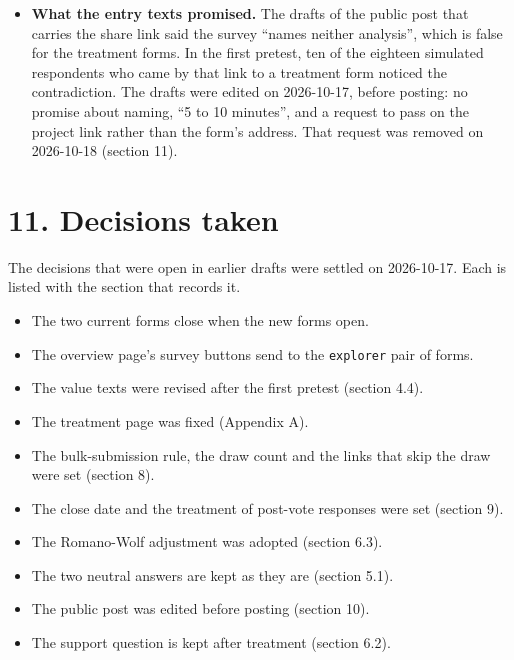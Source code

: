 \begin{itemize}
  seen each value's study on the explorer's dials. The explorer's tips also grade the evidence
  behind each value (data, research, guesswork, scenario or derived), a judgment of this OPA's
  author. Respondents from the explorer in both arms have seen those grades, so the \texttt{explorer}
  stratum's control answers are not those of respondents who met the values without labels or
  grades. The labels may therefore add less than their presence suggests, which shrinks the effect
  that H1 can find.
\item
  \textbf{What the entry texts promised.} The drafts of the public post that carries the share link
  said the survey ``names neither analysis'', which is false for the treatment forms. In the first
  pretest, ten of the eighteen simulated respondents who came by that link to a treatment form
  noticed the contradiction. The drafts were edited on 2026-10-17, before posting: no promise
  about naming, ``5 to 10 minutes'', and a request to pass on the project link rather than the
  form's address. That request was removed on 2026-10-18 (section 11).
\end{itemize}

\section{11. Decisions taken}\label{decisions-taken}

The decisions that were open in earlier drafts were settled on 2026-10-17. Each is listed with the
section that records it.

\begin{itemize}
\tightlist
\item
  The two current forms close when the new forms open.
\item
  The overview page's survey buttons send to the \texttt{explorer} pair of forms.
\item
  The value texts were revised after the first pretest (section 4.4).
\item
  The treatment page was fixed (Appendix A).
\item
  The bulk-submission rule, the draw count and the links that skip the draw were set (section 8).
\item
  The close date and the treatment of post-vote responses were set (section 9).
\item
  The Romano-Wolf adjustment was adopted (section 6.3).
\item
  The two neutral answers are kept as they are (section 5.1).
\item
  The public post was edited before posting (section 10).
\item
  The support question is kept after treatment (section 6.2).
\end{itemize}

